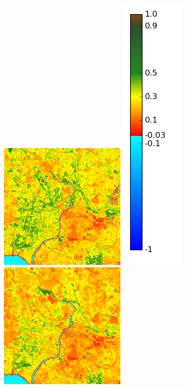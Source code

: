 \documentclass{book}
\begin{document}
\begin{figure}[H]
{\includegraphics[scale=0.4]{images/Agde/06_ndvi.png}
\includegraphics[scale=0.2]{images/colormap.png}
\includegraphics[scale=0.4]{images/Agde/07_ndvi.png}
}
\end{figure}
\end{document}
